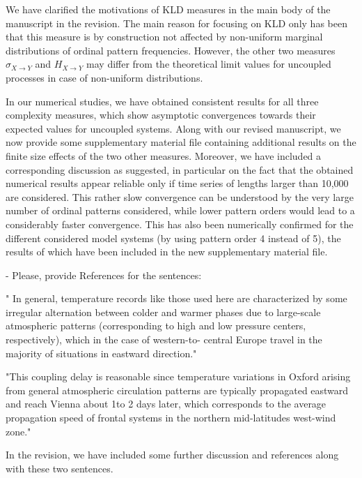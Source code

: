 \documentclass[aps,chaos,superscriptaddress,showkeys]{revtex4}
\begin{document}
\begin{center}
\begin{minipage}[c]{0.9\textwidth}
We have clarified the motivations of KLD measures in the main body of the manuscript in the revision. The main reason for focusing on KLD only has been that this measure is by construction not affected by non-uniform marginal distributions of ordinal pattern frequencies. However, the other two measures $\sigma_{X\to Y}$ and $H_{X\to Y}$ may differ from the theoretical limit values for uncoupled processes in case of non-uniform distributions. 
\vspace{0.6cm}

In our numerical studies, we have obtained consistent results for all three complexity measures, which show asymptotic convergences towards their expected values for uncoupled systems. Along with our revised manuscript, we now provide some supplementary material file containing additional results on the finite size effects of the two other measures. Moreover, we have included a corresponding discussion as suggested, in particular on the fact that the obtained numerical results appear reliable only if time series of lengths larger than 10,000 are considered. This rather slow convergence can be understood by the very large number of ordinal patterns considered, while lower pattern orders would lead to a considerably faster convergence. This has also been numerically confirmed for the different considered model systems (by using pattern order 4 instead of 5), the results of which have been included in the new supplementary material file.
\end{minipage}
\end{center}



\noindent
{- Please, provide References for the sentences: 

" In general, temperature records like those used here are characterized by some irregular alternation between colder and warmer phases due to large-scale atmospheric patterns (corresponding to high and low pressure centers, respectively), which in the case of western-to- central Europe travel in the majority of situations in eastward direction." 


"This coupling delay is reasonable since temperature variations in Oxford arising from general atmospheric circulation patterns are typically propagated eastward and reach Vienna about 1to 2 days later, which corresponds to the average propagation speed of frontal systems in the northern mid-latitudes west-wind zone."}

\begin{center}
\begin{minipage}[c]{0.9\textwidth}
In the revision, we have included some further discussion and references along with these two sentences.
\end{minipage}
\end{center}
\end{document}
